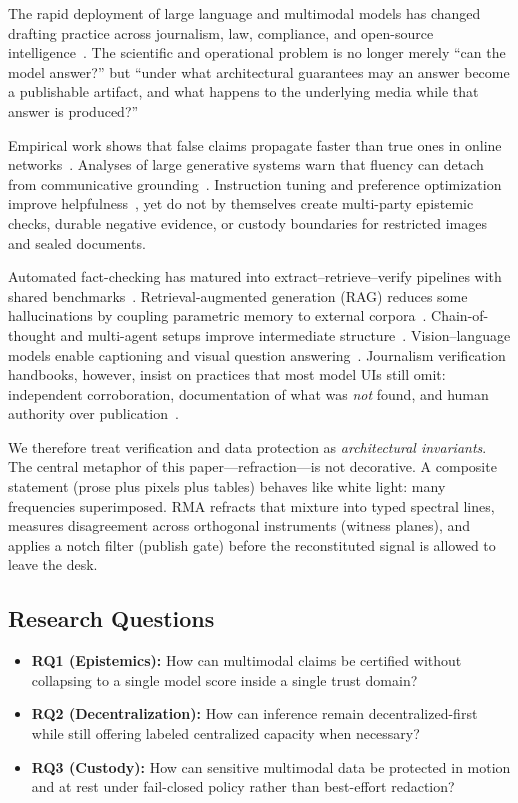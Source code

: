 \documentclass[journal,10pt,twocolumn,a4paper]{IEEEtran}
\begin{document}
The rapid deployment of large language and multimodal models has changed drafting practice across journalism, law, compliance, and open-source intelligence~\cite{openai2023gpt4,bommasani2021foundation,ouyang2022instruct}.
The scientific and operational problem is no longer merely ``can the model answer?'' but ``under what architectural guarantees may an answer become a publishable artifact, and what happens to the underlying media while that answer is produced?''

Empirical work shows that false claims propagate faster than true ones in online networks~\cite{vosoughi2018spread}.
Analyses of large generative systems warn that fluency can detach from communicative grounding~\cite{bender2021stochastic}.
Instruction tuning and preference optimization improve helpfulness~\cite{ouyang2022instruct}, yet do not by themselves create multi-party epistemic checks, durable negative evidence, or custody boundaries for restricted images and sealed documents.

Automated fact-checking has matured into extract--retrieve--verify pipelines with shared benchmarks~\cite{thorne2018fever,guo2022survey,schuster2021get}.
Retrieval-augmented generation (RAG) reduces some hallucinations by coupling parametric memory to external corpora~\cite{lewis2020rag}.
Chain-of-thought and multi-agent setups improve intermediate structure~\cite{wei2022chain,chen2023agents}.
Vision--language models enable captioning and visual question answering~\cite{radford2021clip,karanasou2024multimodal}.
Journalism verification handbooks, however, insist on practices that most model UIs still omit: independent corroboration, documentation of what was \emph{not} found, and human authority over publication~\cite{silverman2015verification,graves2017fact}.

We therefore treat verification and data protection as \emph{architectural invariants}.
The central metaphor of this paper---refraction---is not decorative.
A composite statement (prose plus pixels plus tables) behaves like white light: many frequencies superimposed.
RMA refracts that mixture into typed spectral lines, measures disagreement across orthogonal instruments (witness planes), and applies a notch filter (publish gate) before the reconstituted signal is allowed to leave the desk.

\subsection{Research Questions}
\begin{itemize}
  \item \textbf{RQ1 (Epistemics):} How can multimodal claims be certified without collapsing to a single model score inside a single trust domain?
  \item \textbf{RQ2 (Decentralization):} How can inference remain decentralized-first while still offering labeled centralized capacity when necessary?
  \item \textbf{RQ3 (Custody):} How can sensitive multimodal data be protected in motion and at rest under fail-closed policy rather than best-effort redaction?
\end{itemize}
\end{document}
